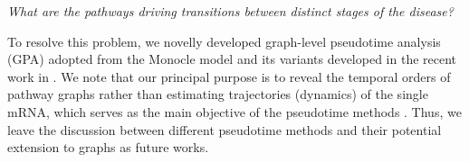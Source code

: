 \documentclass{article} %
\begin{document}
\begin{tcolorbox}[colback=cyan!5, breakable]
{\begin{center}
    \textit{What are the pathways driving transitions between distinct stages of the disease?}
\end{center}
    
    }
\end{tcolorbox}
To resolve this problem, we novelly developed graph-level pseudotime analysis (GPA) adopted from the Monocle model and its variants developed in the recent work in \citep{haghverdi2016diffusion,qiu2017single}. We note that our principal purpose is to reveal the temporal orders of pathway graphs rather than estimating trajectories (dynamics) of the single mRNA, which serves as the main objective of the pseudotime methods \citep{prabhakaran2016dirichlet,gut2015trajectories}. Thus, we leave the discussion between different pseudotime methods and their potential extension to graphs as future works.
\end{document}
